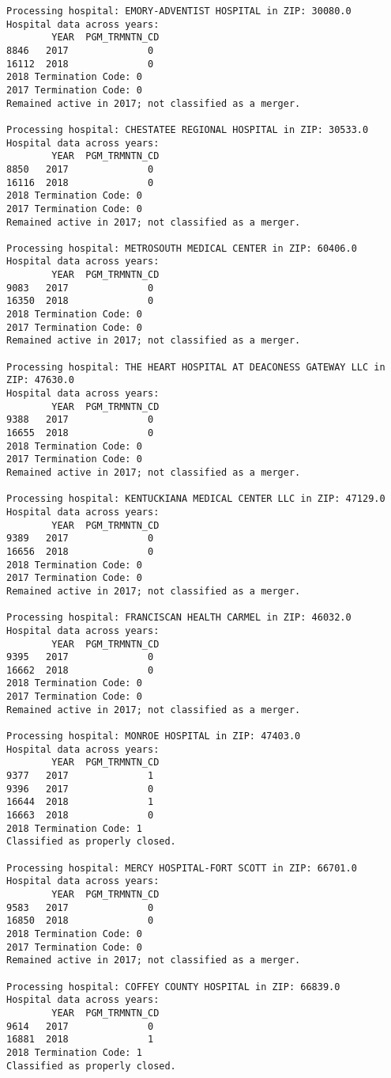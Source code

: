 \documentclass[
  letterpaper,
  DIV=11,
  numbers=noendperiod]{scrartcl}
\begin{document}
\begin{verbatim}
Processing hospital: EMORY-ADVENTIST HOSPITAL in ZIP: 30080.0
Hospital data across years:
        YEAR  PGM_TRMNTN_CD
8846   2017              0
16112  2018              0
2018 Termination Code: 0
2017 Termination Code: 0
Remained active in 2017; not classified as a merger.

Processing hospital: CHESTATEE REGIONAL HOSPITAL in ZIP: 30533.0
Hospital data across years:
        YEAR  PGM_TRMNTN_CD
8850   2017              0
16116  2018              0
2018 Termination Code: 0
2017 Termination Code: 0
Remained active in 2017; not classified as a merger.

Processing hospital: METROSOUTH MEDICAL CENTER in ZIP: 60406.0
Hospital data across years:
        YEAR  PGM_TRMNTN_CD
9083   2017              0
16350  2018              0
2018 Termination Code: 0
2017 Termination Code: 0
Remained active in 2017; not classified as a merger.

Processing hospital: THE HEART HOSPITAL AT DEACONESS GATEWAY LLC in ZIP: 47630.0
Hospital data across years:
        YEAR  PGM_TRMNTN_CD
9388   2017              0
16655  2018              0
2018 Termination Code: 0
2017 Termination Code: 0
Remained active in 2017; not classified as a merger.

Processing hospital: KENTUCKIANA MEDICAL CENTER LLC in ZIP: 47129.0
Hospital data across years:
        YEAR  PGM_TRMNTN_CD
9389   2017              0
16656  2018              0
2018 Termination Code: 0
2017 Termination Code: 0
Remained active in 2017; not classified as a merger.

Processing hospital: FRANCISCAN HEALTH CARMEL in ZIP: 46032.0
Hospital data across years:
        YEAR  PGM_TRMNTN_CD
9395   2017              0
16662  2018              0
2018 Termination Code: 0
2017 Termination Code: 0
Remained active in 2017; not classified as a merger.

Processing hospital: MONROE HOSPITAL in ZIP: 47403.0
Hospital data across years:
        YEAR  PGM_TRMNTN_CD
9377   2017              1
9396   2017              0
16644  2018              1
16663  2018              0
2018 Termination Code: 1
Classified as properly closed.

Processing hospital: MERCY HOSPITAL-FORT SCOTT in ZIP: 66701.0
Hospital data across years:
        YEAR  PGM_TRMNTN_CD
9583   2017              0
16850  2018              0
2018 Termination Code: 0
2017 Termination Code: 0
Remained active in 2017; not classified as a merger.

Processing hospital: COFFEY COUNTY HOSPITAL in ZIP: 66839.0
Hospital data across years:
        YEAR  PGM_TRMNTN_CD
9614   2017              0
16881  2018              1
2018 Termination Code: 1
Classified as properly closed.


\end{verbatim}
\end{document}
